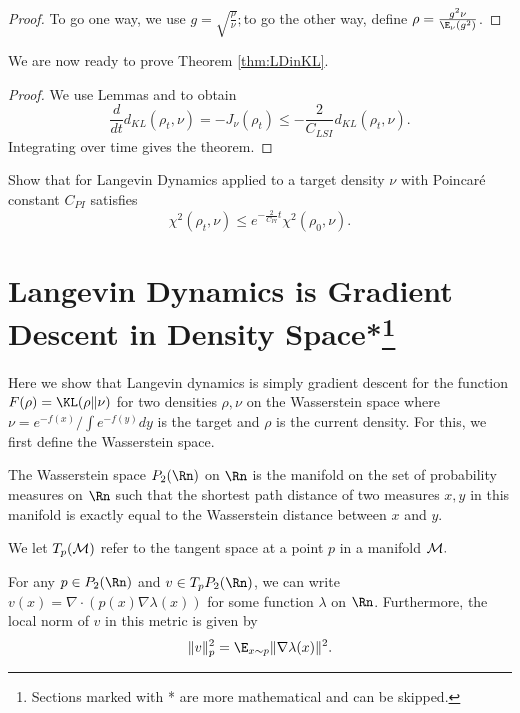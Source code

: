 \begin{proof}
To go one way, we use $g=\sqrt{\frac{\rho}{\nu}};$to go the other
way, define $\rho=\frac{g^{2}\nu}{\E_{\nu}(g^{2})}$.
\end{proof}
We are now ready to prove Theorem \ref{thm:LDinKL}.
\begin{proof}
We use Lemmas and to obtain
\[
\frac{d}{dt}d_{KL}(\rho_{t},\nu)=-J_{\nu}(\rho_{t})\le-\frac{2}{C_{LSI}}d_{KL}(\rho_{t},\nu).
\]
Integrating over time gives the theorem.
\end{proof}
\begin{xca}
Show that for Langevin Dynamics applied to a target density $\nu$
with Poincar\'e constant $C_{PI}$ satisfies 
\[
\chi^{2}(\rho_{t},\nu)\le e^{-\frac{2}{C_{PI}}t}\chi^{2}(\rho_{0},\nu).
\]
\end{xca}

\section{Langevin Dynamics is Gradient Descent in Density Space*\footnote{Sections marked with * are more mathematical and can be skipped.}}\label{sec:LD_GD}

Here we show that Langevin dynamics is simply gradient descent for
the function $F(\rho)=\KL(\rho\|\nu)$ for two densities $\rho,\nu$
on the Wasserstein space where $\nu=e^{-f(x)}/\int e^{-f(y)}dy$ is
the target and $\rho$ is the current density. For this, we first
define the Wasserstein space.
\begin{defn}
The Wasserstein space $P_{2}(\Rn)$ on $\Rn$ is the manifold on the
set of probability measures on $\Rn$ such that the shortest path
distance of two measures $x,y$ in this manifold is exactly equal
to the Wasserstein distance between $x$ and $y$.

We let $T_{p}({\cal M})$ refer to the tangent space at a point $p$
in a manifold ${\cal M}.$
\end{defn}

\begin{lem}
\label{lem:local-norm}For any $p\in P_{2}(\Rn)$ and $v\in T_{p}P_{2}(\Rn)$,
we can write $v(x)=\nabla\cdot(p(x)\nabla\lambda(x))$ for some function
$\lambda$ on $\Rn$. Furthermore, the local norm of $v$ in this
metric is given by
\[
\|v\|_{p}^{2}=\E_{x\sim p}\|\nabla\lambda(x)\|^{2}.
\]
\end{lem}

